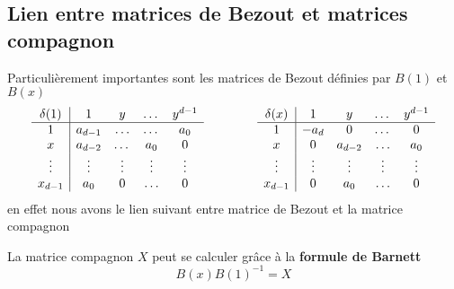 \documentclass{standalone}
\begin{document}
\subsection{Lien entre matrices de Bezout et matrices compagnon}
\label{Bar}
Particulièrement importantes sont les matrices de Bezout définies par $B(1)$ et $B(x)$
\begin{equation}
	\begin{array}{c|cccc}
		\delta(1) & 1 & y & \dots & y^{d-1} \\
		\hline
		1 & a_{d-1} & \ldots & \dots & a_0 \\
		x & a_{d-2} & \dots & a_0 & 0 \\
		\vdots & \vdots & \vdots & \vdots & \vdots \\
		x_{d-1} & a_0 & 0 & \ldots & 0 \\
	\end{array}
	\hspace{1.5cm}
	\begin{array}{c|cccc}
		\delta(x) & 1 & y & \dots & y^{d-1} \\
		\hline
		1 & -a_{d} & 0 & \dots & 0 \\
		x & 0 & a_{d-2} & \ldots & a_0 \\
		\vdots & \vdots & \vdots & \vdots & \vdots \\
		x_{d-1} & 0 & a_0 & \ldots & 0 \\
	\end{array}
\end{equation}
en effet nous avons le lien suivant entre matrice de Bezout et la matrice compagnon
\begin{prop}
\label{Barnett}
La matrice compagnon $X$ peut se calculer grâce à la {\bf formule de Barnett}
\cite{Barnett}
\begin{equation}
	B(x)B(1)^{-1} = X
\end{equation}
\end{prop}
\end{document}
